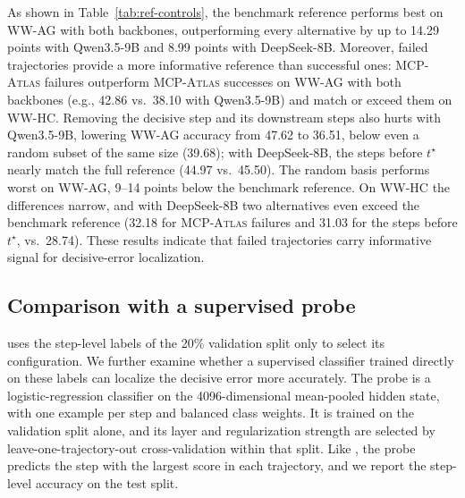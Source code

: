 As shown in Table~\ref{tab:ref-controls}, the benchmark reference performs best on \textsc{WW-AG} with both backbones, outperforming every alternative by up to 14.29 points with Qwen3.5-9B and 8.99 points with DeepSeek-8B. Moreover, failed trajectories provide a more informative reference than successful ones: \textsc{MCP-Atlas} failures outperform \textsc{MCP-Atlas} successes on \textsc{WW-AG} with both backbones (e.g., 42.86 vs.\ 38.10 with Qwen3.5-9B) and match or exceed them on \textsc{WW-HC}. Removing the decisive step and its downstream steps also hurts with Qwen3.5-9B, lowering \textsc{WW-AG} accuracy from 47.62 to 36.51, below even a random subset of the same size (39.68); with DeepSeek-8B, the steps before $t^\star$ nearly match the full reference (44.97 vs.\ 45.50). The random basis performs worst on \textsc{WW-AG}, 9--14 points below the benchmark reference. On \textsc{WW-HC} the differences narrow, and with DeepSeek-8B two alternatives even exceed the benchmark reference (32.18 for \textsc{MCP-Atlas} failures and 31.03 for the steps before $t^\star$, vs.\ 28.74). These results indicate that failed trajectories carry informative signal for decisive-error localization.


\subsection{Comparison with a supervised probe}
\label{app:probe}

\soap{} uses the step-level labels of the 20\% validation split only to select its configuration. We further examine whether a supervised classifier trained directly on these labels can localize the decisive error more accurately. The probe is a logistic-regression classifier on the 4096-dimensional mean-pooled hidden state, with one example per step and balanced class weights. It is trained on the validation split alone, and its layer and regularization strength are selected by leave-one-trajectory-out cross-validation within that split. Like \soap{}, the probe predicts the step with the largest score in each trajectory, and we report the step-level accuracy on the test split.

